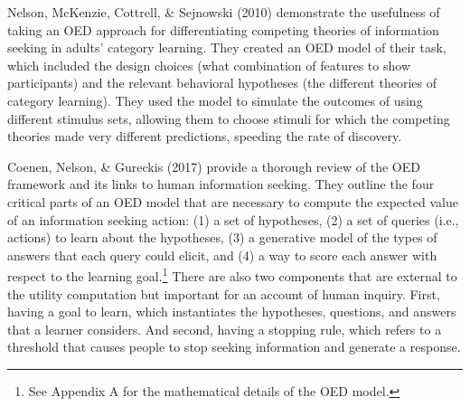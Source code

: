 \documentclass[oneside]{report}
\begin{document}

Nelson, McKenzie, Cottrell, \& Sejnowski (2010) demonstrate the
usefulness of taking an OED approach for differentiating competing
theories of information seeking in adults' category learning. They
created an OED model of their task, which included the design choices
(what combination of features to show participants) and the relevant
behavioral hypotheses (the different theories of category learning).
They used the model to simulate the outcomes of using different stimulus
sets, allowing them to choose stimuli for which the competing theories
made very different predictions, speeding the rate of discovery.

Coenen, Nelson, \& Gureckis (2017) provide a thorough review of the OED
framework and its links to human information seeking. They outline the
four critical parts of an OED model that are necessary to compute the
expected value of an information seeking action: (1) a set of
hypotheses, (2) a set of queries (i.e., actions) to learn about the
hypotheses, (3) a generative model of the types of answers that each
query could elicit, and (4) a way to score each answer with respect to
the learning goal.\footnote{See Appendix A for the mathematical details
  of the OED model.} There are also two components that are external to
the utility computation but important for an account of human inquiry.
First, having a goal to learn, which instantiates the hypotheses,
questions, and answers that a learner considers. And second, having a
stopping rule, which refers to a threshold that causes people to stop
seeking information and generate a response.
\end{document}
